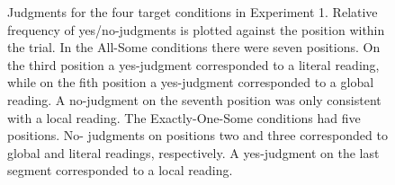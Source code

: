 \documentclass[fleqn,reqno,10pt,draft]{article}
\begin{document}
\begin{figure}[]
\centering
{}


\caption[Optional caption for list of figures]{Judgments for the four
  target conditions in Experiment 1. Relative frequency of
  yes/no-judgments is plotted against the position within the
  trial. In the All-Some conditions there were seven positions. On the
  third position a yes-judgment corresponded to a literal reading,
  while on the fith position a yes-judgment corresponded to a global
  reading.  A no-judgment on the seventh position was only consistent
  with a local reading. The Exactly-One-Some conditions had five
  positions. No- judgments on positions two and three corresponded to
  global and literal readings, respectively. A yes-judgment on the
  last segment corresponded to a local reading. }
\label{fig:JudgmentsK2}
\end{figure}
\end{document}
